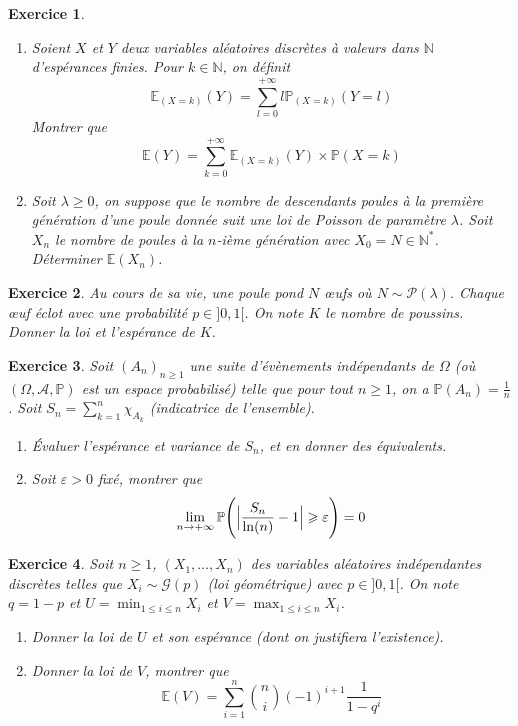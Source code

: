 \documentclass[12pt]{article}
\newtheorem{exercise}{Exercice}[section]
\theoremstyle{remark}
\theoremstyle{remark}
\newcommand{\N}{\mathbb{N}}
\newcommand{\E}{\mathbb{E}}
\renewcommand{\P}{\mathbb{P}}
\begin{document}
\begin{exercise}
	\phantom{}
	\begin{enumerate}
		\item Soient $X$ et $Y$ deux variables aléatoires discrètes à valeurs
		dans $\N$ d'espérances finies. Pour $k\in\N$, on définit
		$$\E_{(X=k)}(Y)=\sum_{l=0}^{+\infty}l\P_{(X=k)}(Y=l)$$
		Montrer que
		$$\E(Y)=\sum_{k=0}^{+\infty}\E_{(X=k)}(Y)\times\P(X=k)$$
		\item Soit $\lambda\geqslant0$, on suppose que le nombre de descendants
		poules à la première génération d'une poule donnée suit une loi de
		Poisson de paramètre $\lambda$. Soit $X_{n}$ le nombre de poules à la
		$n$-ième génération avec $X_{0}=N\in\N^{*}$. Déterminer $\E(X_{n})$.
	\end{enumerate}
\end{exercise}

\begin{exercise}
	Au cours de sa vie, une poule pond $N$ \oe ufs où
	$N\sim\mathcal{P}(\lambda)$. Chaque \oe uf éclot avec une probabilité
	$p\in]0,1[$. On note $K$ le nombre de poussins. Donner la loi et l'espérance
	de $K$.
\end{exercise}

\begin{exercise}
	Soit $(A_{n})_{n\geqslant1}$ une suite d'évènements indépendants de $\Omega$
	(où $(\Omega,\mathcal{A},\P)$ est un espace probabilisé) telle que pour tout
	$n\geqslant1$, on a $\P(A_{n})=\frac{1}{n}$. Soit
	$S_{n}=\sum_{k=1}^{n}\chi_{A_{k}}$ (indicatrice de l'ensemble).
	\begin{enumerate}
		\item Évaluer l'espérance et variance de $S_{n}$, et en donner des équivalents.
		\item Soit $\varepsilon>0$ fixé, montrer que 
		$$\lim\limits_{n\to+\infty}\P\Biggl(\Bigl\vert\frac{S_{n}}{\ln(n)}-1\Bigr\vert\geqslant\varepsilon\Biggr)=0$$
	\end{enumerate}
\end{exercise}

\begin{exercise}
	Soit $n\geqslant1$, $(X_{1},\dots,X_{n})$ des variables aléatoires
	indépendantes discrètes telles que $X_{i}\sim\mathcal{G}(p)$ (loi
	géométrique) avec $p\in]0,1[$. On note $q=1-p$ et $U=\min_{1\leqslant
	i\leqslant n}X_{i}$ et $V=\max_{1\leqslant i\leqslant n}X_{i}$.
	\begin{enumerate}
		\item Donner la loi de $U$ et son espérance (dont on justifiera l'existence).
		\item Donner la loi de $V$, montrer que
		$$\E(V)=\sum_{i=1}^{n}\binom{n}{i}(-1)^{i+1}\frac{1}{1-q^{i}}$$
	\end{enumerate}
\end{exercise}
\end{document}
